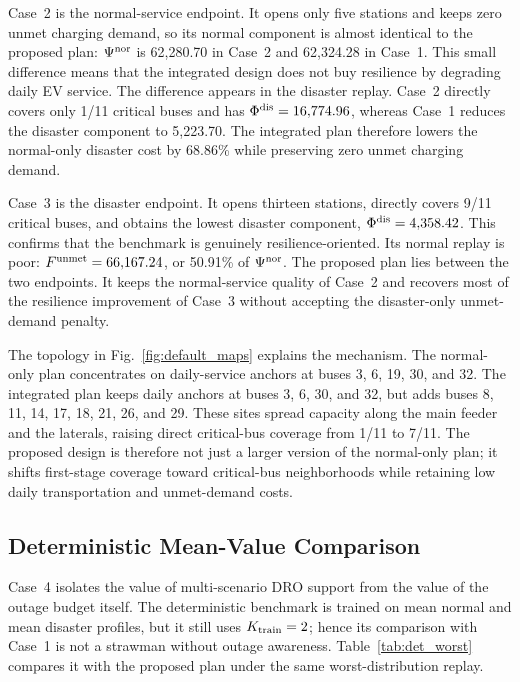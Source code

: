 Case~2 is the normal-service endpoint. It opens only five stations and keeps
zero unmet charging demand, so its normal component is almost identical to the
proposed plan: $\Psi^{\rm nor}$ is 62,280.70 in Case~2 and 62,324.28 in
Case~1. This small difference means that the integrated design does not buy
resilience by degrading daily EV service. The difference appears in the
disaster replay. Case~2 directly covers only 1/11 critical buses and has
$\Phi^{\rm dis}=16{,}774.96$, whereas Case~1 reduces the disaster component to
5,223.70. The integrated plan therefore lowers the normal-only disaster cost by
68.86\% while preserving zero unmet charging demand.

Case~3 is the disaster endpoint. It opens thirteen stations, directly covers
9/11 critical buses, and obtains the lowest disaster component,
$\Phi^{\rm dis}=4{,}358.42$. This confirms that the benchmark is genuinely
resilience-oriented. Its normal replay is poor: $F^{\rm unmet}=66{,}167.24$,
or 50.91\% of $\Psi^{\rm nor}$. The proposed plan lies between the two
endpoints. It keeps the normal-service quality of Case~2 and recovers most of
the resilience improvement of Case~3 without accepting the disaster-only
unmet-demand penalty.

The topology in Fig.~\ref{fig:default_maps} explains the mechanism. The
normal-only plan concentrates on daily-service anchors at buses 3, 6, 19, 30,
and 32. The integrated plan keeps daily anchors at buses 3, 6, 30, and 32, but
adds buses 8, 11, 14, 17, 18, 21, 26, and 29. These sites spread capacity
along the main feeder and the laterals, raising direct critical-bus coverage
from 1/11 to 7/11. The proposed design is therefore not just a larger version
of the normal-only plan; it shifts first-stage coverage toward critical-bus
neighborhoods while retaining low daily transportation and unmet-demand costs.

\subsection{Deterministic Mean-Value Comparison}
Case~4 isolates the value of multi-scenario DRO support from the value of the
outage budget itself. The deterministic benchmark is trained on mean normal and
mean disaster profiles, but it still uses $K_{\rm train}=2$; hence its
comparison with Case~1 is not a strawman without outage awareness.
Table~\ref{tab:det_worst} compares it with the proposed plan under the same
worst-distribution replay.

